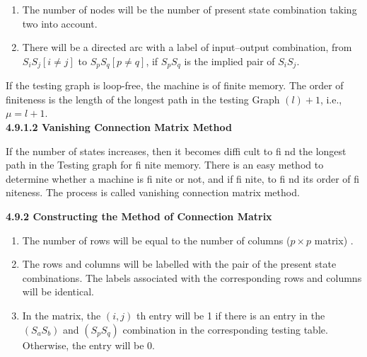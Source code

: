 \documentclass[9pt]{beamer}
\begin{document}
\begin{frame}
\begin{enumerate}
  \item The number of nodes will be the number of present state combination taking two into account.\\
  \item There will be a directed arc with a label of input–output combination, from $S_iS_j [i \neq j]$ to $S_pS_q
[p \neq q]$, if $S_pS_q$ is the implied pair of $S_iS_j$.\\
\end{enumerate}

\vspace*{0.2cm}
\hspace{0.5cm} If the testing graph is loop-free, the machine is of finite memory. The order of finiteness is the length
of the longest path in the testing Graph $(l) + 1$, i.e., $\mu = l + 1$.\\

\vspace*{0.4cm}
\large{
\textbf{4.9.1.2 Vanishing Connection Matrix Method}\\
}

\vspace*{0.2cm}
\small{
If the number of states increases, then it becomes diffi cult to fi nd the longest path in the Testing graph
for fi nite memory. There is an easy method to determine whether a machine is fi nite or not, and if fi nite,
to fi nd its order of fi niteness. The process is called vanishing connection matrix method.\\
}

\vspace*{0.4cm}
\end{frame}

\begin{frame}
\large{
\textbf{4.9.2 Constructing the Method of Connection Matrix}\\
}

\vspace*{0.2cm}
\small{
\begin{enumerate}
  \item The number of rows will be equal to the number of columns ($p \times p$ matrix) .\\
  \item The rows and columns will be labelled with the pair of the present state combinations. The labels
associated with the corresponding rows and columns will be identical.\\
  \item In the matrix, the $(i, j)$ th entry will be 1 if there is an entry in the $(S_aS_b)$ and $(S_pS_q)$ combination in
the corresponding testing table. Otherwise, the entry will be 0.\\
\end{enumerate}
}

\vspace*{0.4cm}
\end{frame}
\end{document}
